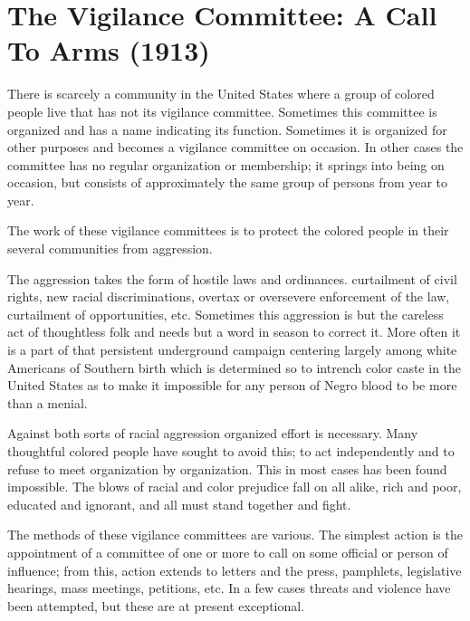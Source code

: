 \documentclass[letterpaper,10pt,english]{jupyterBook}
\begin{document}
\section{The Vigilance Committee: A Call To Arms (1913)}
\label{\detokenize{Volumes/06/01/vigilance_committee:the-vigilance-committee-a-call-to-arms-1913}}\label{\detokenize{Volumes/06/01/vigilance_committee::doc}}
\sphinxAtStartPar
There is scarcely a community in the United States where a group of colored people live that has not its vigilance committee. Sometimes this committee is organized and has a name indicating its function. Sometimes it is organized for other purposes and becomes a vigilance committee on occasion. In other cases the committee has no regular organization or membership; it springs into being on occasion, but consists of approximately the same group of persons from year to year.

\sphinxAtStartPar
The work of these vigilance committees is to protect the colored people in their several communities from aggression.

\sphinxAtStartPar
The aggression takes the form of hostile laws and ordinances. curtailment of civil rights, new racial discriminations, overtax or oversevere enforcement of the law, curtailment of opportunities, etc. Sometimes this aggression is but the careless act of thoughtless folk and needs but a word in season to correct it. More often it is a part of that persistent underground campaign centering largely among white Americans of Southern birth which is determined so to intrench color caste in the United States as to make it impossible for any person of Negro blood to be more than a menial.

\sphinxAtStartPar
Against both sorts of racial aggression organized effort is necessary. Many thoughtful colored people have sought to avoid this; to act independently and to refuse to meet organization by organization. This in most cases has been found impossible. The blows of racial and color prejudice fall on all alike, rich and poor, educated and ignorant, and all must stand together and fight.

\sphinxAtStartPar
The methods of these vigilance committees are various. The simplest action is the appointment of a committee of one or more to call on some official or person of influence; from this, action extends to letters and the press, pamphlets, legislative hearings, mass meetings, petitions, etc. In a few cases threats and violence have been attempted, but these are at present exceptional.
\end{document}
